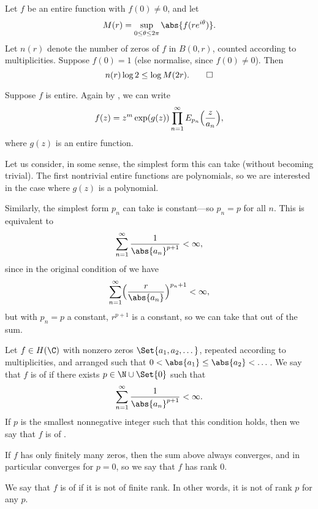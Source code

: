 \begin{exercise}\label{hw8.2}
	Let $f$ be an entire function with $f(0) \neq 0$, and let
	\[
		M(r) = \sup_{0 \leq \theta \leq 2 \pi} \abs{f(r e^{i \theta})}.
	\]
	Let $n(r)$ denote the number of zeros of $f$ in $B(0, r)$, counted according to multiplicities.
	Suppose $f(0) = 1$ (else normalise, since $f(0) \neq 0$).
	Then
	\[
		n(r) \log 2 \leq \log M(2 r). \qedhere
	\]
\end{exercise}


Suppose $f$ is entire.
Again by , we can write
\[
	f(z) = z^m \exp(g(z)) \prod_{n = 1}^\infty E_{p_n}\Bigl( \frac{z}{a_n} \Bigr),
\]
where $g(z)$ is an entire function.

Let us consider, in some sense, the simplest form this can take (without becoming trivial).
The first nontrivial entire functions are polynomials, so we are interested in the case where $g(z)$ is a polynomial.

Similarly, the simplest form $p_n$ can take is constant---so $p_n = p$ for all $n$.
This is equivalent to
\[
	\sum_{n = 1}^\infty \frac{1}{\abs{a_n}^{p + 1}} < \infty,
\]
since in the original condition of  we have
\[
	\sum_{n = 1}^\infty \Bigl( \frac{r}{\abs{a_n}} \Bigr)^{p_n + 1} < \infty,
\]
but with $p_n = p$ a constant, $r^{p + 1}$ is a constant, so we can take that out of the sum.

\begin{definition}[Rank]
	Let $f \in H(\C)$ with nonzero zeros $\Set{a_1, a_2, \dots}$, repeated according to multiplicities, and arranged such that $0 < \abs{a_1} \leq \abs{a_2} < \dots$.
	We say that $f$ is of  if there exists $p \in \N \cup \Set{0}$ such that
	\[
		\sum_{n = 1}^\infty \frac{1}{\abs{a_n}^{p + 1}} < \infty.
	\]
	If $p$ is the smallest nonnegative integer such that this condition holds, then we say that $f$ is of .
\end{definition}

\begin{remark}
	\begin{items}
		\item If $f$ has only finitely many zeros, then the sum above always converges, and in particular converges for $p = 0$, so we say that $f$ has rank $0$.

		\item We say that $f$ is of  if it is not of finite rank.
		In other words, it is not of rank $p$ for any $p$.
	\end{items}
\end{remark}

